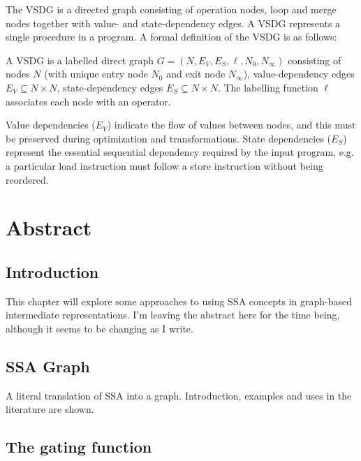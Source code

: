 The VSDG is a directed graph consisting of operation nodes, loop and merge nodes together with value- and state-dependency edges. A VSDG represents a single procedure in a program. A formal definition of the VSDG is as follows:

\begin{definition}
A VSDG is a labelled direct graph $G=(N,E_{V},E_{S},\ell,N_{0},N_{\infty})$ consisting of nodes $N$ (with unique entry node $N_{0}$ and exit node $N_{\infty}$), value-dependency edges $E_{V}\subseteq N\times N$, state-dependency edges $E_{S}\subseteq N \times N$. The labelling function $\ell$ associates each node with an operator.
\end{definition}

Value dependencies ($E_{V}$) indicate the flow of values between nodes, and this must be preserved during optimization and transformations. State dependencies ($E_{S}$) represent  the essential sequential dependency required by the input program, e.g. a particular load instruction must follow a store instruction without being reordered.




\section*{Abstract}

\subsection*{Introduction}

This chapter will explore some approaches to using SSA concepts in graph-based intermediate representations. I'm leaving the abstract here for the time being, although it seems to be changing as I write.

\subsection*{SSA Graph}

A literal translation of SSA into a graph. Introduction, examples and uses in the literature are shown.

\subsection*{The gating function}

